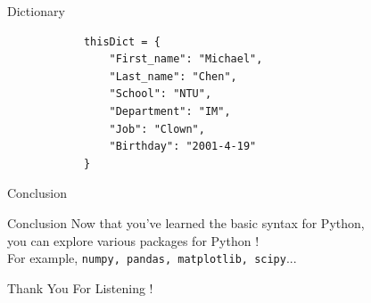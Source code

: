 \documentclass{beamer}
\begin{document}
    \begin{frame}[fragile]{Dictionary}
        \begin{verbatim}
            thisDict = {
                "First_name": "Michael",
                "Last_name": "Chen",
                "School": "NTU",
                "Department": "IM",
                "Job": "Clown",
                "Birthday": "2001-4-19"
            }
        \end{verbatim}
    \end{frame}
    
    \begin{frame}[plain, c]
        \begin{center}
            \color{blue} \LARGE Conclusion
        \end{center}
    \end{frame}
    
    \begin{frame}{Conclusion}
        Now that you've learned the basic syntax for Python, \\
        you can explore various packages for Python ! \\
        For example, \texttt{numpy, pandas, matplotlib, scipy}... \\
        
    \end{frame}
    
    \begin{frame}[plain, c]
        \begin{center}
            \color{blue} \LARGE Thank You For Listening !
        \end{center}
    \end{frame}
\end{document}

